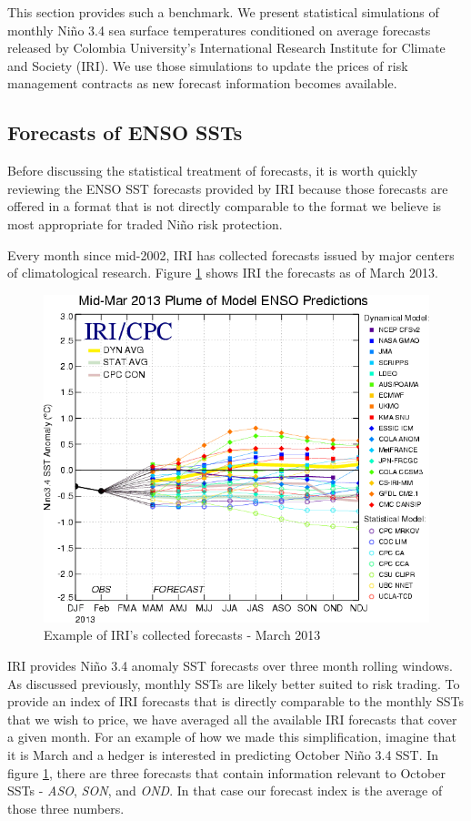 \documentclass[authoryear]{article}
\begin{document}
This section provides such a benchmark. We present statistical simulations of monthly Ni\~no 3.4 sea surface temperatures conditioned on average forecasts released by Colombia University's International Research Institute for Climate and Society (IRI). We use those simulations to update the prices of risk management contracts as new forecast information becomes available.

\subsection{Forecasts of ENSO SSTs}
Before discussing the statistical treatment of forecasts, it is worth quickly reviewing the ENSO SST forecasts provided by IRI because those forecasts are offered in a format that is not directly comparable to the format we believe is most appropriate for traded Ni\~no risk protection. 

Every month since mid-2002, IRI has collected forecasts issued by major centers of climatological research. Figure \ref{fig:forecastExamples} shows IRI the forecasts as of March 2013.

\begin{figure}
  \begin{center}
  \includegraphics[width=.5\linewidth]{Pricingfigs/SST_table_march_ex}
  \caption{Example of IRI's collected forecasts - March 2013}
   \label{fig:forecastExamples}
   \end{center}
\end{figure}

IRI provides Ni\~no 3.4 anomaly SST forecasts over three month rolling windows. As discussed previously, monthly SSTs are likely better suited to risk trading. To provide an index of IRI  forecasts that is directly comparable to the monthly SSTs that we wish to price, we have averaged all the available IRI forecasts that cover a given month. For an example of how we made this simplification, imagine that it is March and a hedger is interested in predicting October Ni\~no 3.4 SST. In figure \ref{fig:forecastExamples}, there are three forecasts that contain information relevant to October SSTs - \emph{ASO}, \emph{SON}, and \emph{OND}. In that case our forecast index is the average of those three numbers. 
\end{document}
